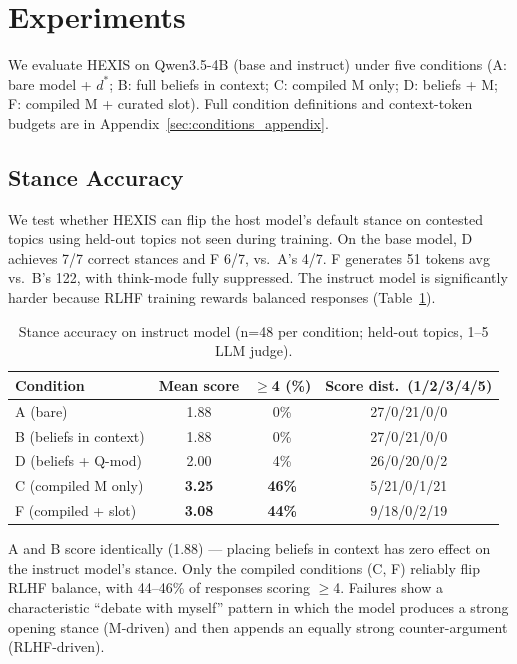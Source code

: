 \section{Experiments}
\label{sec:experiments}

We evaluate HEXIS on Qwen3.5-4B (base and instruct) under five conditions (A: bare model + $d^*$; B: full beliefs in context; C: compiled M only; D: beliefs + M; F: compiled M + curated slot). Full condition definitions and context-token budgets are in Appendix~\ref{sec:conditions_appendix}.

\subsection{Stance Accuracy}
\label{sec:stance_accuracy}

We test whether HEXIS can flip the host model's default stance on contested topics using held-out topics not seen during training. On the base model, D achieves 7/7 correct stances and F 6/7, vs.\ A's 4/7. F generates 51 tokens avg vs.\ B's 122, with think-mode fully suppressed. The instruct model is significantly harder because RLHF training rewards balanced responses (Table~\ref{tab:stance_instruct}).

\begin{table}[!ht]
\centering
\small
\caption{Stance accuracy on instruct model (n=48 per condition; held-out topics, 1--5 LLM judge).}
\label{tab:stance_instruct}
\begin{tabular}{lccc}
\toprule
\textbf{Condition} & \textbf{Mean score} & \textbf{$\geq$4 (\%)} & \textbf{Score dist.\ (1/2/3/4/5)} \\
\midrule
A (bare) & 1.88 & 0\% & 27/0/21/0/0 \\
B (beliefs in context) & 1.88 & 0\% & 27/0/21/0/0 \\
D (beliefs + Q-mod) & 2.00 & 4\% & 26/0/20/0/2 \\
C (compiled M only) & \textbf{3.25} & \textbf{46\%} & 5/21/0/1/21 \\
F (compiled + slot) & \textbf{3.08} & \textbf{44\%} & 9/18/0/2/19 \\
\bottomrule
\end{tabular}
\end{table}

A and B score identically (1.88) --- placing beliefs in context has zero effect on the instruct model's stance. Only the compiled conditions (C, F) reliably flip RLHF balance, with 44--46\% of responses scoring $\geq$4. Failures show a characteristic ``debate with myself'' pattern in which the model produces a strong opening stance (M-driven) and then appends an equally strong counter-argument (RLHF-driven).

